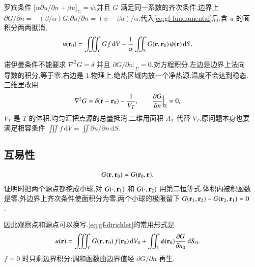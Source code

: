 罗宾条件 $\bigl[\alpha\partial u/\partial n+\beta u\bigr]_{\Sigma}=\psi$,并且 $G$ 满足同一系数的齐次条件.边界上 $\partial G/\partial n=-(\beta/\alpha)G$,$\partial u/\partial n=(\psi-\beta u)/\alpha$.代入\eqref{eq:gf-fundamental}后,含 $u$ 的面积分两两抵消,
\begin{equation}
  u({\mathbf{r}}_0)
  =\iiint_{T} G f\,\mathrm{d}V
  -\frac{1}{\alpha}\iint_{\Sigma} G({\mathbf{r}},{\mathbf{r}}_0)\,\psi({\mathbf{r}})\,\mathrm{d}S.
  \label{eq:gf-robin}
\end{equation}

诺伊曼条件不能要求 $\nabla^2 G=\delta$ 并且 $\partial G/\partial n|_{\Sigma}=0$.对方程积分,左边是边界上法向导数的积分,等于零,右边是 $1$.物理上,绝热区域内放一个净热源,温度不会达到稳态.三维里改用
\begin{equation}
  \nabla^2 G=\delta({\mathbf{r}}-{\mathbf{r}}_0)-\frac{1}{V_T},
  \qquad
  \frac{\partial G}{\partial n}\Big|_{\Sigma}=0,
\end{equation}
$V_T$ 是 $T$ 的体积.均匀汇把点源的总量抵消.二维用面积 $A_T$ 代替 $V_T$.原问题本身也要满足相容条件 $\iiint f\,\mathrm{d}V=\iint\partial u/\partial n\,\mathrm{d}S$.

\subsection{互易性}
\begin{equation}
  G({\mathbf{r}},{\mathbf{r}}_0)=G({\mathbf{r}}_0,{\mathbf{r}}).
  \label{eq:gf-reciprocity}
\end{equation}
证明时把两个源点都挖成小球,对 $G(\cdot,{\mathbf{r}}_1)$ 和 $G(\cdot,{\mathbf{r}}_2)$ 用第二恒等式.体积内被积函数是零,外边界上齐次条件使面积分为零,两个小球的极限留下 $G({\mathbf{r}}_1,{\mathbf{r}}_2)-G({\mathbf{r}}_2,{\mathbf{r}}_1)=0$.

因此观察点和源点可以换写.\eqref{eq:gf-dirichlet}的常用形式是
\begin{equation}
  u({\mathbf{r}})
  =\iiint_{T} G({\mathbf{r}},{\mathbf{r}}_0)\,f({\mathbf{r}}_0)\,\mathrm{d}V_0
  +\iint_{\Sigma}\phi({\mathbf{r}}_0)\frac{\partial G}{\partial n_0}\,\mathrm{d}S_0.
  \label{eq:gf-dirichlet-obs}
\end{equation}
$f=0$ 时只剩边界积分:调和函数由边界值经 $\partial G/\partial n$ 再生.

